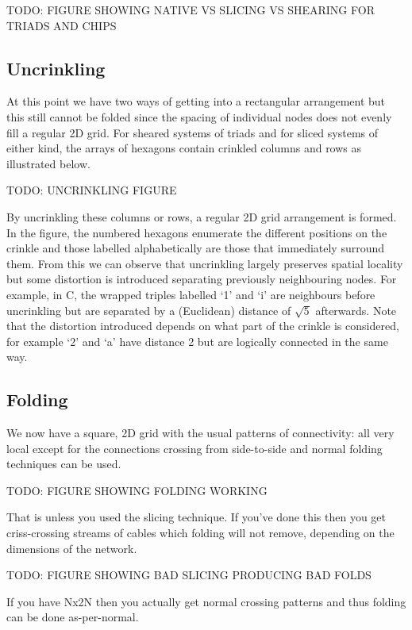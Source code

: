 			TODO: FIGURE SHOWING NATIVE VS SLICING VS SHEARING FOR TRIADS AND CHIPS
			
		\subsection{Uncrinkling}
			
			At this point we have two ways of getting into a rectangular arrangement
			but this still cannot be folded since the spacing of individual nodes
			does not evenly fill a regular 2D grid. For sheared systems of triads and
			for sliced systems of either kind, the arrays of hexagons contain
			crinkled columns and rows as illustrated below.
			
			TODO: UNCRINKLING FIGURE
			
			By uncrinkling these columns or rows, a regular 2D grid arrangement is
			formed. In the figure, the numbered hexagons enumerate the different
			positions on the crinkle and those labelled alphabetically are those that
			immediately surround them. From this we can observe that uncrinkling
			largely preserves spatial locality but some distortion is introduced
			separating previously neighbouring nodes. For example, in C, the wrapped
			triples labelled `1' and `i' are neighbours before uncrinkling but are
			separated by a (Euclidean) distance of $\sqrt{5}$ afterwards. Note that
			the distortion introduced depends on what part of the crinkle is
			considered, for example `2' and `a' have distance 2 but are logically
			connected in the same way.
		
		\subsection{Folding}
			
			We now have a square, 2D grid with the usual patterns of connectivity:
			all very local except for the connections crossing from side-to-side and
			normal folding techniques can be used.
			
			TODO: FIGURE SHOWING FOLDING WORKING
			
			That is unless you used the slicing technique. If you've done this then
			you get criss-crossing streams of cables which folding will not remove,
			depending on the dimensions of the network.
			
			TODO: FIGURE SHOWING BAD SLICING PRODUCING BAD FOLDS
			
			If you have Nx2N then you actually get normal crossing patterns and thus
			folding can be done as-per-normal.
			
